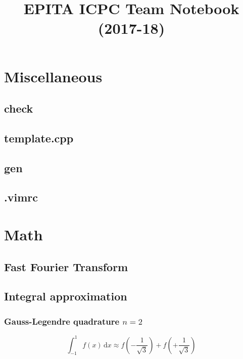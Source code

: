 \documentclass[10pt]{article}
\title{\vspace{-4ex}\Large{EPITA ICPC Team Notebook (2017-18)}}
\author{}
\date{}
\begin{document}
\begin{landscape}
\begin{multicols}{2}

\maketitle
\vspace{-13ex}
\tableofcontents
\pagestyle{fancy}

\section{Miscellaneous}

\subsection{check}

\subsection{template.cpp}
\hrulefill

\subsection{gen}

\subsection{.vimrc}

\section{Math}

\subsection{Fast Fourier Transform}

\subsection{Integral approximation}

\subsubsection{Gauss-Legendre quadrature $n = 2$}
\begin{equation}
    \int_{-1}^{1} f(x) \, \mathrm{d}x \approx
    f\left(-\frac{1}{\sqrt{3}}\right) +
    f\left(+\frac{1}{\sqrt{3}}\right)
\end{equation}


\end{multicols}
\end{landscape}
\end{document}
